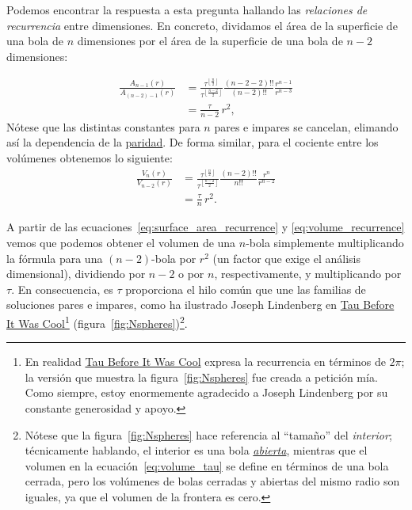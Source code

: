 Podemos encontrar la respuesta a esta pregunta hallando las \emph{relaciones de recurrencia} entre dimensiones. En concreto, dividamos el área de la superficie de una bola de $n$ dimensiones por el área de la superficie de una bola de $n-2$ dimensiones:

\begin{equation}
  \label{eq:surface_area_recurrence}
  \begin{split}
  \frac{A_{n-1}(r)}{A_{(n-2)-1}(r)} & =
  \frac{\tau^{\left\lfloor \frac{n}{2} \right\rfloor}}{\tau^{\left\lfloor \frac{n-2}{2} \right\rfloor}}
  \frac{(n-2-2)!!}{(n-2)!!}
  \frac{r^{n-1}}{r^{n-3}}
  \\ & = \frac{\tau}{n-2}\,r^2,
  \end{split}
\end{equation}
Nótese que las distintas constantes para $n$ pares e impares se cancelan, elimando así la dependencia de la \href{https://es.wikipedia.org/wiki/N%C3%BAmeros_pares_e_impares}{paridad}. De forma similar, para el cociente entre los volúmenes obtenemos lo siguiente:
\begin{equation}
\label{eq:volume_recurrence}
\begin{split}
\frac{V_n(r)}{V_{n-2}(r)} & =
\frac{\tau^{\left\lfloor \frac{n}{2} \right\rfloor}}{\tau^{\left\lfloor \frac{n-2}{2} \right\rfloor}}
\frac{(n-2)!!}{n!!}
\frac{r^{n}}{r^{n-2}}
\\ & = \frac{\tau}{n}\,r^2.
\end{split}
\end{equation}

A partir de las ecuaciones~\eqref{eq:surface_area_recurrence} y \eqref{eq:volume_recurrence} vemos que podemos obtener el volumen de una $n$-bola simplemente multiplicando la fórmula para una $(n-2)$-bola por $r^2$ (un factor que exige el análisis dimensional), dividiendo por $n-2$ o por $n$, respectivamente, y multiplicando por $\tau$. En consecuencia, es $\tau$ proporciona el hilo común que une las familias de soluciones pares e impares, como ha ilustrado Joseph Lindenberg en \href{http://sites.google.com/site/taubeforeitwascool/}{Tau Before It Was Cool}\footnote{En realidad \href{https://sites.google.com/site/taubeforeitwascool/}{Tau Before It Was Cool} expresa la recurrencia en términos de $2\pi$; la versión que muestra la figura~\ref{fig:Nspheres} fue creada a petición mía. Como siempre, estoy enormemente agradecido a Joseph Lindenberg por su constante generosidad y apoyo.} (figura~\ref{fig:Nspheres})\footnote{Nótese que la figura~\ref{fig:Nspheres} hace referencia al ``tamaño'' del \emph{interior}; técnicamente hablando, el interior es una bola \href{https://es.wikipedia.org/wiki/Conjunto_abierto}{\emph{abierta}}, mientras que el volumen en la ecuación~\eqref{eq:volume_tau} se define en términos de una bola cerrada, pero los volúmenes de bolas cerradas y abiertas del mismo radio son iguales, ya que el volumen de la frontera es cero.}.

